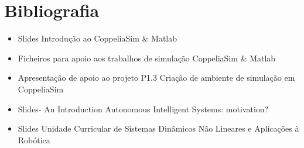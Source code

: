 
\chapter{Bibliografia}
\label{ch:bib}
\begin{itemize}
    \item Slides Introdução ao CoppeliaSim \& Matlab
    \item Ficheiros para apoio aos trabalhos de simulação CoppeliaSim \& Matlab
    \item Apresentação de apoio ao projeto P1.3 Criação de ambiente de simulação em CoppeliaSim
    \item Slides- An Introduction Autonomous Intelligent Systems: motivation?
    \item Slides Unidade Curricular de Sistemas Dinâmicos Não Lineares e Aplicações à Robótica
\end{itemize}




